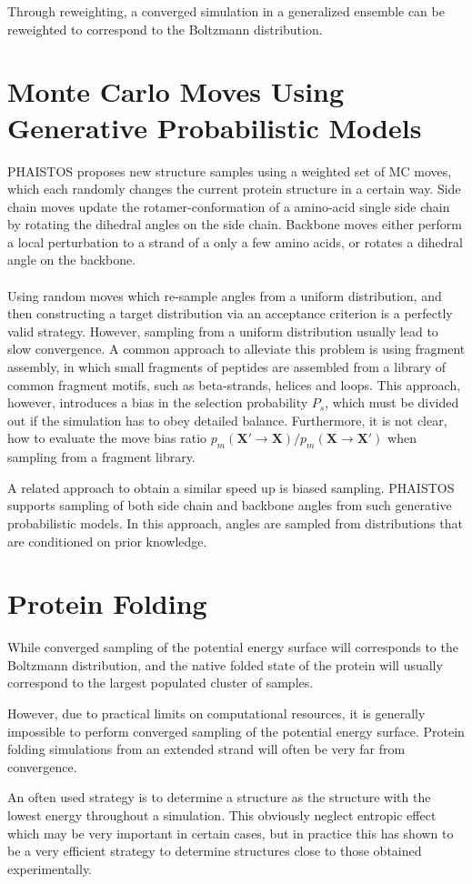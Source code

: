 Through reweighting, a converged simulation in a generalized ensemble can be reweighted to correspond to the Boltzmann distribution.


\section{Monte Carlo Moves Using Generative Probabilistic Models}
\label{chap:generative}
PHAISTOS proposes new structure samples using a weighted set of MC moves, which each randomly changes the current protein structure in a certain way. 
Side chain moves update the rotamer-conformation of a amino-acid single side chain by rotating the dihedral angles on the side chain.
Backbone moves either perform a local perturbation to a strand of a only a few amino acids, or rotates a dihedral angle on the backbone.
\\\\Using random moves which re-sample angles from a uniform distribution, and then constructing a target distribution via an acceptance criterion is a perfectly valid strategy.
However, sampling from a uniform distribution usually lead to slow convergence.
A common approach to alleviate this problem is using fragment assembly, in which small fragments of peptides are assembled from a library of common fragment motifs, such as beta-strands, helices and loops.
This approach, however, introduces a bias in the selection probability $P_s$, which must be divided out if the simulation has to obey detailed balance.
Furthermore, it is not clear, how to evaluate the move bias ratio $p_m(\mathbf{X'} \rightarrow \mathbf{X}) / p_m(\mathbf{X} \rightarrow \mathbf{X'})$ when sampling from a fragment library.

A related approach to obtain a similar speed up is biased sampling. 
PHAISTOS supports sampling of both side chain and backbone angles from such generative probabilistic models.
In this approach, angles are sampled from distributions that are conditioned on prior knowledge. 




\section{Protein Folding}
While converged sampling of the potential energy surface will corresponds to the Boltzmann distribution, and the native folded state of the protein will usually correspond to the largest populated cluster of samples.

However, due to practical limits on computational resources, it is generally impossible to perform converged sampling of the potential energy surface.
Protein folding simulations from an extended strand will often be very far from convergence.

An often used strategy is to determine a structure as the structure with the lowest energy throughout a simulation. This obviously neglect entropic effect which may be very important in certain cases, but in practice this has shown to be a very efficient strategy to determine structures close to those obtained experimentally.


